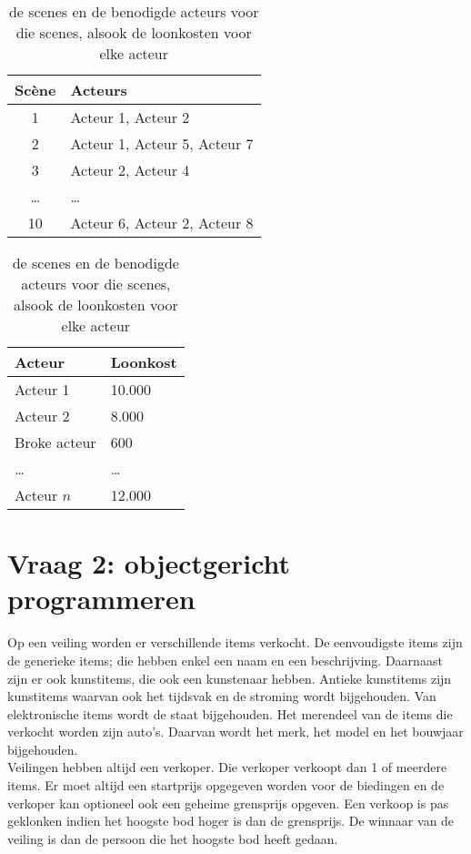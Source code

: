 \documentclass[kulak]{kulakarticle} %
\begin{document}
	\begin{table}[h!]
		\centering
		\begin{tabular}{| c | l |}
			\hline
			Scène & Acteurs \\
			\hline
			1 & Acteur 1, Acteur 2 \\
			\hline
			2 & Acteur 1, Acteur 5, Acteur 7 \\
			\hline
			3 & Acteur 2, Acteur 4 \\
			\hline
			\ldots & \ldots \\
			\hline
			10 & Acteur 6, Acteur 2, Acteur 8 \\
			\hline
		\end{tabular}
		\hspace{1cm}
		\begin{tabular}{| l | l |}
			\hline
			Acteur & Loonkost \\
			\hline
			Acteur 1 & 10.000 \\
			\hline
			Acteur 2 & 8.000 \\
			\hline
			Broke acteur & 600 \\
			\hline
			\ldots & \ldots \\
			\hline
			Acteur \(n\) & 12.000 \\
			\hline
		\end{tabular}

		\caption{de scenes en de benodigde acteurs voor die scenes, alsook de loonkosten voor elke acteur}
		\label{tabel}
	\end{table}

	\newpage

	\section*{Vraag 2: objectgericht programmeren}

	Op een veiling worden er verschillende items verkocht. De eenvoudigste items zijn de generieke items; die hebben enkel een naam en een beschrijving. Daarnaast zijn er ook kunstitems, die ook een kunstenaar hebben. Antieke kunstitems zijn kunstitems waarvan ook het tijdsvak en de stroming wordt bijgehouden. Van elektronische items wordt de staat bijgehouden. Het merendeel van de items die verkocht worden zijn auto's. Daarvan wordt het merk, het model en het bouwjaar bijgehouden. \\

	Veilingen hebben altijd een verkoper. Die verkoper verkoopt dan 1 of meerdere items. Er moet altijd een startprijs opgegeven worden voor de biedingen en de verkoper kan optioneel ook een geheime grensprijs opgeven. Een verkoop is pas geklonken indien het hoogste bod hoger is dan de grensprijs. De winnaar van de veiling is dan de persoon die het hoogste bod heeft gedaan.\\
\end{document}
